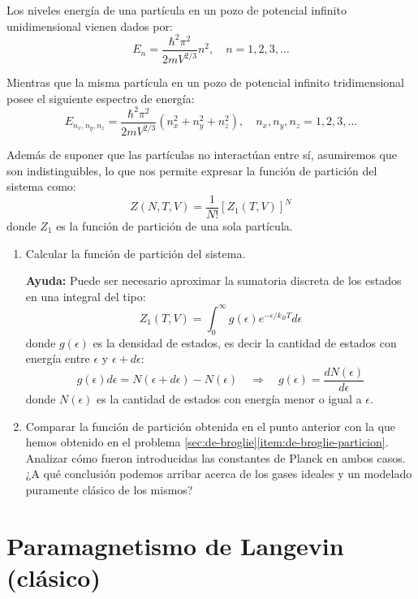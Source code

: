 \documentclass[a4paper,11pt]{article}
\begin{document}
Los niveles energía de una partícula en un pozo de potencial infinito
unidimensional vienen dados por:
$$ E_n = \frac{\hbar^2 \pi^2}{2m V^{2/3}} n^2, \quad n=1, 2, 3, \dots $$

\noindent Mientras que la misma partícula en un pozo de potencial infinito
tridimensional posee el siguiente espectro de energía:
$$ E_{n_x, n_y, n_z} = \frac{\hbar^2 \pi^2}{2m V^{2/3}} (n_x^2 + n_y^2 + n_z^2),
\quad n_x, n_y, n_z = 1, 2, 3, \dots $$


Además de suponer que las partículas no interactúan entre sí,
asumiremos que son indistinguibles, lo que nos permite expresar la
función de partición del sistema como:
$$ Z(N,T,V) = \frac{1}{N!} [Z_1(T, V)]^N $$
donde $Z_1$ es la función de partición de una sola partícula.


\begin{enumerate}[label=(\alph*),
                  leftmargin=2\parindent,
                  rightmargin=2\parindent]

    \item{Calcular la función de partición del sistema.}

    {\small
    \textbf{Ayuda:} Puede ser necesario aproximar la sumatoria
    discreta de los estados en una integral del tipo:
    $$ Z_1(T, V) =
    \int_0^\infty g(\epsilon) e^{-\epsilon/k_B T} d\epsilon $$
    donde $g(\epsilon)$ es la densidad de estados, es decir la cantidad de
    estados con energía entre $\epsilon$ y $\epsilon + d\epsilon$:
    $$ g(\epsilon) d\epsilon = N(\epsilon + d\epsilon) - N(\epsilon)
    \quad \Rightarrow \quad g(\epsilon) = \frac{d N(\epsilon)}{d\epsilon} $$
    donde $N(\epsilon)$ es la cantidad de estados con energía menor o
    igual a $\epsilon$.
    }

    \item{Comparar la función de partición obtenida en el punto
          anterior con la que hemos obtenido en el problema
          \ref{sec:de-broglie}\ref{item:de-broglie-particion}.
          Analizar cómo fueron introducidas las constantes de Planck
          en ambos casos. ¿A qué conclusión podemos arribar acerca
          de los gases ideales y un modelado puramente clásico de los
          mismos?
          }

\end{enumerate}


\section{Paramagnetismo de Langevin (clásico)}
\label{sec:paramagnetismo-langevin}
\end{document}
